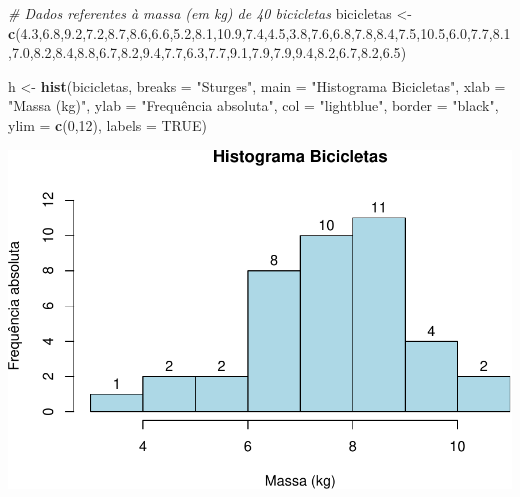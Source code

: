 \documentclass[
]{book}
\newenvironment{Shaded}{\begin{snugshade}}{\end{snugshade}}
\newcommand{\AttributeTok}[1]{\textcolor[rgb]{0.13,0.29,0.53}{#1}}
\newcommand{\CommentTok}[1]{\textcolor[rgb]{0.56,0.35,0.01}{\textit{#1}}}
\newcommand{\ConstantTok}[1]{\textcolor[rgb]{0.56,0.35,0.01}{#1}}
\newcommand{\DecValTok}[1]{\textcolor[rgb]{0.00,0.00,0.81}{#1}}
\newcommand{\FloatTok}[1]{\textcolor[rgb]{0.00,0.00,0.81}{#1}}
\newcommand{\FunctionTok}[1]{\textcolor[rgb]{0.13,0.29,0.53}{\textbf{#1}}}
\newcommand{\NormalTok}[1]{#1}
\newcommand{\OtherTok}[1]{\textcolor[rgb]{0.56,0.35,0.01}{#1}}
\newcommand{\StringTok}[1]{\textcolor[rgb]{0.31,0.60,0.02}{#1}}
\begin{document}
\begin{Shaded}
\begin{Highlighting}[]
\CommentTok{\# Dados referentes à massa (em kg) de 40 bicicletas}
\NormalTok{bicicletas }\OtherTok{\textless{}{-}} \FunctionTok{c}\NormalTok{(}\FloatTok{4.3}\NormalTok{,}\FloatTok{6.8}\NormalTok{,}\FloatTok{9.2}\NormalTok{,}\FloatTok{7.2}\NormalTok{,}\FloatTok{8.7}\NormalTok{,}\FloatTok{8.6}\NormalTok{,}\FloatTok{6.6}\NormalTok{,}\FloatTok{5.2}\NormalTok{,}\FloatTok{8.1}\NormalTok{,}\FloatTok{10.9}\NormalTok{,}\FloatTok{7.4}\NormalTok{,}\FloatTok{4.5}\NormalTok{,}\FloatTok{3.8}\NormalTok{,}\FloatTok{7.6}\NormalTok{,}\FloatTok{6.8}\NormalTok{,}\FloatTok{7.8}\NormalTok{,}\FloatTok{8.4}\NormalTok{,}\FloatTok{7.5}\NormalTok{,}\FloatTok{10.5}\NormalTok{,}\FloatTok{6.0}\NormalTok{,}\FloatTok{7.7}\NormalTok{,}\FloatTok{8.1}\NormalTok{,}\FloatTok{7.0}\NormalTok{,}\FloatTok{8.2}\NormalTok{,}\FloatTok{8.4}\NormalTok{,}\FloatTok{8.8}\NormalTok{,}\FloatTok{6.7}\NormalTok{,}\FloatTok{8.2}\NormalTok{,}\FloatTok{9.4}\NormalTok{,}\FloatTok{7.7}\NormalTok{,}\FloatTok{6.3}\NormalTok{,}\FloatTok{7.7}\NormalTok{,}\FloatTok{9.1}\NormalTok{,}\FloatTok{7.9}\NormalTok{,}\FloatTok{7.9}\NormalTok{,}\FloatTok{9.4}\NormalTok{,}\FloatTok{8.2}\NormalTok{,}\FloatTok{6.7}\NormalTok{,}\FloatTok{8.2}\NormalTok{,}\FloatTok{6.5}\NormalTok{)}
  
\NormalTok{h }\OtherTok{\textless{}{-}} \FunctionTok{hist}\NormalTok{(bicicletas,}
          \AttributeTok{breaks =} \StringTok{"Sturges"}\NormalTok{,}
          \AttributeTok{main =} \StringTok{"Histograma Bicicletas"}\NormalTok{,}
          \AttributeTok{xlab =} \StringTok{"Massa (kg)"}\NormalTok{,}
          \AttributeTok{ylab =} \StringTok{"Frequência absoluta"}\NormalTok{,}
          \AttributeTok{col =} \StringTok{"lightblue"}\NormalTok{,}
          \AttributeTok{border =} \StringTok{"black"}\NormalTok{,}
          \AttributeTok{ylim =} \FunctionTok{c}\NormalTok{(}\DecValTok{0}\NormalTok{,}\DecValTok{12}\NormalTok{),}
          \AttributeTok{labels =} \ConstantTok{TRUE}\NormalTok{)}
\end{Highlighting}
\end{Shaded}

\includegraphics{introR_files/figure-latex/unnamed-chunk-170-1.pdf}
\end{document}
